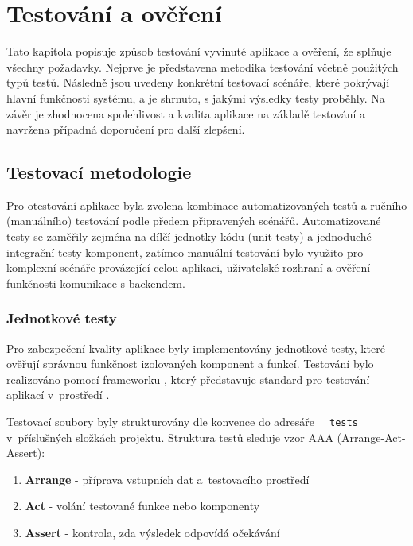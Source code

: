 \documentclass[czech, bp, kiv, he, iso690numb, pdf]{fasthesis}
\begin{document}
    \chapter{Testování a ověření}

    Tato kapitola popisuje způsob testování vyvinuté aplikace a ověření, že splňuje všechny požadavky. Nejprve je představena metodika testování včetně použitých typů testů. Následně jsou uvedeny konkrétní testovací scénáře, které pokrývají hlavní funkčnosti systému, a je shrnuto, s jakými výsledky testy proběhly. Na závěr je zhodnocena spolehlivost a kvalita aplikace na základě testování a navržena případná doporučení pro další zlepšení.

    \section{Testovací metodologie}

    Pro otestování aplikace byla zvolena kombinace automatizovaných testů a ručního (manuálního) testování podle předem připravených scénářů. Automatizované testy se zaměřily zejména na dílčí jednotky kódu (unit testy) a jednoduché integrační testy komponent, zatímco manuální testování bylo využito pro komplexní scénáře provázející celou aplikaci, uživatelské rozhraní a ověření funkčnosti komunikace s backendem.

    \subsection*{Jednotkové testy}

    Pro zabezpečení kvality aplikace byly implementovány jednotkové testy, které ověřují správnou funkčnost izolovaných komponent a funkcí. Testování bylo realizováno pomocí frameworku , který představuje standard pro testování aplikací v~prostředí  \cite{jest2025}.

    Testovací soubory byly strukturovány dle konvence do adresáře \texttt{\_\_tests\_\_} v~příslušných složkách projektu. Struktura testů sleduje vzor AAA (Arrange-Act-Assert):

    \begin{enumerate}
        \item \textbf{Arrange} - příprava vstupních dat a~testovacího prostředí
        \item \textbf{Act} - volání testované funkce nebo komponenty
        \item \textbf{Assert} - kontrola, zda výsledek odpovídá očekávání
    \end{enumerate}
\end{document}
